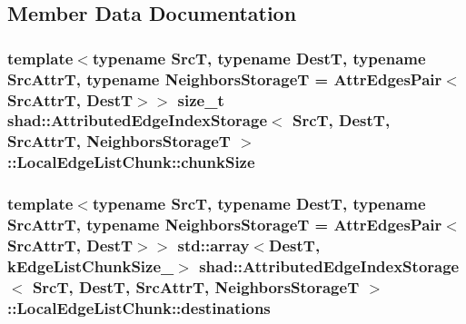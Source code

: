 \subsection{Member Data Documentation}
\hypertarget{structshad_1_1AttributedEdgeIndexStorage_1_1LocalEdgeListChunk_aa0d9a52e5792802e3f3a304fcc397eb8}{
\subsubsection[{chunk\-Size}]{\setlength{\rightskip}{0pt plus 5cm}template$<$typename Src\-T, typename Dest\-T, typename Src\-Attr\-T, typename Neighbors\-Storage\-T = Attr\-Edges\-Pair$<$\-Src\-Attr\-T, Dest\-T$>$$>$ size\-\_\-t {\bf shad\-::\-Attributed\-Edge\-Index\-Storage}$<$ Src\-T, Dest\-T, Src\-Attr\-T, Neighbors\-Storage\-T $>$\-::Local\-Edge\-List\-Chunk\-::chunk\-Size}}\label{structshad_1_1AttributedEdgeIndexStorage_1_1LocalEdgeListChunk_aa0d9a52e5792802e3f3a304fcc397eb8}
\hypertarget{structshad_1_1AttributedEdgeIndexStorage_1_1LocalEdgeListChunk_a2be655891bf3c2614163b2edf8770420}{
\subsubsection[{destinations}]{\setlength{\rightskip}{0pt plus 5cm}template$<$typename Src\-T, typename Dest\-T, typename Src\-Attr\-T, typename Neighbors\-Storage\-T = Attr\-Edges\-Pair$<$\-Src\-Attr\-T, Dest\-T$>$$>$ std\-::array$<$Dest\-T, {\bf k\-Edge\-List\-Chunk\-Size\-\_\-}$>$ {\bf shad\-::\-Attributed\-Edge\-Index\-Storage}$<$ Src\-T, Dest\-T, Src\-Attr\-T, Neighbors\-Storage\-T $>$\-::Local\-Edge\-List\-Chunk\-::destinations}}\label{structshad_1_1AttributedEdgeIndexStorage_1_1LocalEdgeListChunk_a2be655891bf3c2614163b2edf8770420}
